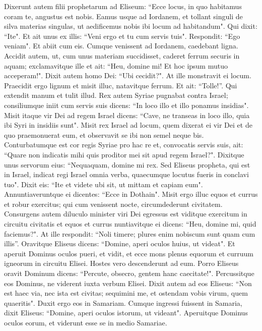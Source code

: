 \begin{biblechapter}  
\verse Dixerunt autem filii prophetarum ad Eliseum: “Ecce locus, in quo habitamus coram te, angustus est nobis. 
\verse Eamus usque ad Iordanem, et tollant singuli de silva materias singulas, ut aedificemus nobis ibi locum ad habitandum". Qui dixit: “Ite". 
\verse Et ait unus ex illis: “Veni ergo et tu cum servis tuis". Respondit: “Ego veniam". 
\verse Et abiit cum eis. Cumque venissent ad Iordanem, caedebant ligna. 
\verse Accidit autem, ut, cum unus materiam succidisset, caderet ferrum securis in aquam; exclamavitque ille et ait: “Heu, domine mi! Et hoc ipsum mutuo acceperam!". 
\verse Dixit autem homo Dei: “Ubi cecidit?". At ille monstravit ei locum. Praecidit ergo lignum et misit illuc, natavitque ferrum.  
\verse Et ait: “Tolle!”. Qui extendit manum et tulit illud. 
\verse Rex autem Syriae pugnabat contra Israel; consiliumque iniit cum servis suis dicens: “In loco illo et illo ponamus insidias". 
\verse Misit itaque vir Dei ad regem Israel dicens: “Cave, ne transeas in loco illo, quia ibi Syri in insidiis sunt". 
\verse Misit rex Israel ad locum, quem dixerat ei vir Dei et de quo praemonuerat eum, et observavit se ibi non semel neque bis. 
\verse Conturbatumque est cor regis Syriae pro hac re et, convocatis servis suis, ait: “Quare non indicatis mihi quis proditor mei sit apud regem Israel?". 
\verse Dixitque unus servorum eius: “Nequaquam, domine mi rex. Sed Eliseus propheta, qui est in Israel, indicat regi Israel omnia verba, quaecumque locutus fueris in conclavi tuo". 
\verse Dixit eis: “Ite et videte ubi sit, ut mittam et capiam eum". Annuntiaveruntque ei dicentes: “Ecce in Dothain". 
\verse Misit ergo illuc equos et currus et robur exercitus; qui cum venissent nocte, circumdederunt civitatem. 
\verse Consurgens autem diluculo minister viri Dei egressus est viditque exercitum in circuitu civitatis et equos et currus nuntiavitque ei dicens: “Heu, domine mi, quid faciemus?". 
\verse At ille respondit: “Noli timere; plures enim nobiscum sunt quam cum illis”. 
\verse Oravitque Eliseus dicens: “Domine, aperi oculos huius, ut videat". Et aperuit Dominus oculos pueri, et vidit, et ecce mons plenus equorum et curruum igneorum in circuitu Elisei. 
\verse Hostes vero descenderunt ad eum. Porro Eliseus oravit Dominum dicens: “Percute, obsecro, gentem hanc caecitate!". Percussitque eos Dominus, ne viderent iuxta verbum Elisei. 
\verse Dixit autem ad eos Eliseus: “Non est haec via, nec ista est civitas; sequimini me, et ostendam vobis virum, quem quaeritis". Duxit ergo eos in Samariam. 
\verse Cumque ingressi fuissent in Samaria, dixit Eliseus: “Domine, aperi oculos istorum, ut videant". Aperuitque Dominus oculos eorum, et viderunt esse se in medio Samariae. 

\end{biblechapter}
